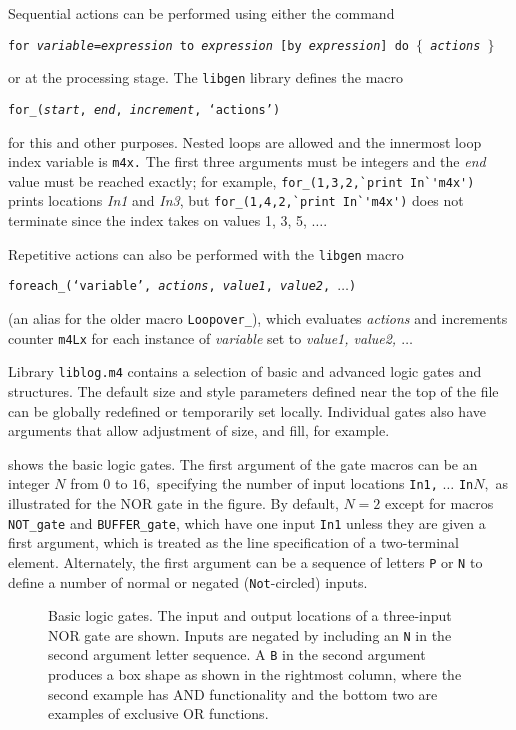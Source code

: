 \pagebreak
{}
Sequential actions can be performed using either the
 \dpic command

{\tt for {\sl variable}={\sl expression} to {\sl expression}
 [by {\sl expression}] do $\lbrace$ {\sl actions} $\rbrace$}

\noindent
or at the
\Mfour processing stage.  The {\tt libgen} library defines the macro

{\tt for\_({\sl start}, {\sl end}, {\sl increment}, `{\sl actions}')}

\noindent
for this and other purposes.  Nested loops are allowed and the innermost loop
index variable is {\tt m4x.}
The first three arguments must be
integers and the {\sl end} value must be reached exactly; for example,
\verb|for_(1,3,2,`print In`'m4x')| prints locations {\sl In1} and {\sl In3},
but \verb|for_(1,4,2,`print In`'m4x')| does not terminate since the
index takes on values 1, 3, 5, $\ldots$.

Repetitive actions can also be performed with the {\tt libgen} macro

{\tt foreach\_(`{\sl variable}', {\sl actions}, {\sl value1},
 {\sl value2}, $\ldots$)}

\noindent
(an alias for the older macro {\tt Loopover\_}),
which evaluates {\sl actions} and increments counter {\tt m4Lx}
for each instance of {\sl variable} set to {\sl value1, value2, $\ldots$}

Library {\tt liblog.m4} contains a selection of basic and advanced logic
gates and structures.  The default size and style parameters defined
near the top of the file can be globally redefined or temporarily set
locally. Individual gates also have arguments that allow adjustment of
size, and fill, for example.

 shows the basic logic gates.  The first argument of the gate
macros can be an integer $N$ from $0$ to $16,$ specifying the number
of input locations {\tt In1,} $\ldots$ {\tt In}$N,$ as illustrated
for the NOR gate in the figure.  By default, $N=2$ except for macros
{\tt NOT\_gate} and {\tt BUFFER\_gate}, which have one input {\tt In1}
unless they are given a first argument, which is treated as the line
specification of a two-terminal element. Alternately, the first argument
can be a sequence of letters {\tt P} or {\tt N} to define a number of
normal or negated ({\tt Not}-circled) inputs. 
\begin{figure}[H]
   \vspace*{-0.5\baselineskip}
   
   \caption{Basic logic gates.  The input and output locations of
      a three-input NOR gate are shown.  Inputs are negated by
      including an {\tt N} in the second argument letter sequence.  A {\tt B}
      in the second argument produces a box shape as shown in the rightmost
      column, where the second example has AND functionality and
      the bottom two are examples of exclusive OR functions.}
   \label{Logic}
   \end{figure}

